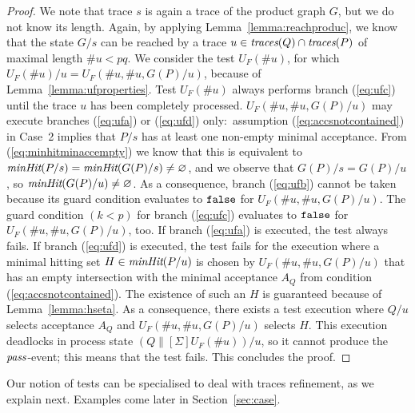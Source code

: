 \begin{proof}
\medskip
{} We note that trace $s$ is again a trace of the
product graph $G$, but we do not know its length. Again, by applying
Lemma~\ref{lemma:reachproduc}, we know that the state $G/s$ can be reached by
a trace $u\in\text{\it traces}(Q)\cap\text{\it traces}(P)$ of maximal length $\#u < pq$. We consider
the test $U_F(\# u)$, for which $U_F(\# u)/u = U_F(\#u,\#u,G(P)/u)$, because
of Lemma~\ref{lemma:ufproperties}. Test $U_F(\#u)$   always performs branch
(\ref{eq:ufc}) until the trace $u$ has been completely processed.
$U_F(\#u,\#u,G(P)/u)$ may execute branches (\ref{eq:ufa}) or (\ref{eq:ufd})
only:~assumption (\ref{eq:accsnotcontained}) in Case~2 implies that $P/s$ has
at least one non-empty minimal acceptance. From (\ref{eq:minhitminaccempty})
we know that this is equivalent to $\text{\it minHit}(P/s) =
\text{\it minHit}(G(P)/s)\neq\varnothing$, and we observe that $G(P)/s = G(P)/u$, so
$\text{\it minHit}(G(P)/u)\neq\varnothing$. As a consequence, branch (\ref{eq:ufb})
cannot be taken because its guard condition evaluates to $\mbox{{\tt false}}$  for
$U_F(\#u,\#u,G(P)/u)$. The guard condition $(k < p)$ for branch
(\ref{eq:ufc}) evaluates to $\mbox{{\tt false}}$ for $U_F(\#u,\#u,G(P)/u)$, too. If branch
(\ref{eq:ufa}) is executed, the test always fails. If branch (\ref{eq:ufd})
is executed, the test fails for the execution where a minimal hitting set
$H\in\text{\it minHit}(P/u)$ is chosen by $U_F(\#u,\#u,G(P)/u)$ that has an empty
intersection with the minimal acceptance $A_Q$ from condition
(\ref{eq:accsnotcontained}). The existence of such an $H$ is guaranteed
because of Lemma~\ref{lemma:hseta}. As a consequence, there exists a test
execution   where $Q/u$ selects acceptance $A_Q$ and $U_F(\#u,\#u,G(P)/u)$
selects $H$. This execution deadlocks in process state
$(Q\parallel[\Sigma]U_F(\# u))/u$, so it cannot produce the ${\text{\it pass}}$-event;
 this means that the test fails. This
concludes the proof. \xbox
\end{proof}
%
Our notion of tests can be specialised to deal with traces refinement, as we
explain next. Examples come later in Section~\ref{sec:case}. 

